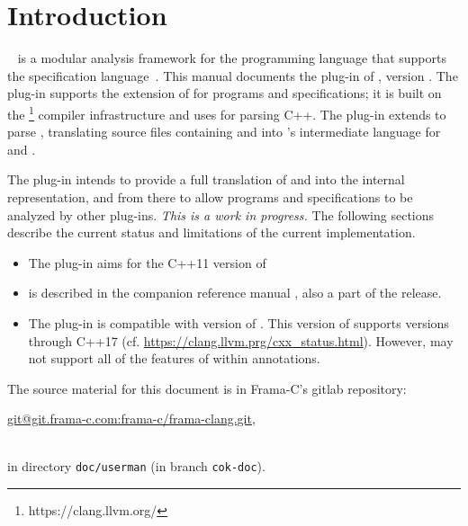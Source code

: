 \chapter{Introduction}

\framac~\cite{userman,fac15} is a modular analysis framework for the \C
programming language that supports the \acsl specification
language~\cite{acsl}. This manual documents the \fclang plug-in of \framac,
version \fclangversion. 
The \fclang plug-in supports the \acslpp extension of \acsl for \cpp programs and specifications; 
it is built on the \clang\footnote{https://clang.llvm.org/} compiler infrastructure and uses \clang for 
parsing C++. The plug-in extends \clang to parse \acslpp, translating source files containing \cpp and \acslpp into \framac's intermediate language for \C and \acsl.

The \fclang plug-in intends to provide a full translation of \cpp and \acslpp into the \framac internal representation, and from there to allow \cpp programs and \acslpp specifications to be analyzed by other \framac plug-ins. 
\textit{This is a work in progress.}
The following sections describe the current status and limitations of the current implementation.
\begin{itemize}
	\item The plug-in aims for the C++11 version of \cpp
	\item \acslpp is described in the companion \acslpp reference manual \cite{acslpp}, also a part of the \framac release.
    \item The plug-in is compatible with version \clangversion of \clang. 
    This version of \clang supports \cpp versions through C++17 
    (cf. \url{https://clang.llvm.prg/cxx_status.html}). 
    However, \fclang may not support all of the features of \cpp within annotations.
\end{itemize}

The source material for this document is in Frama-C's gitlab repository:\\ \centerline{\url{git@git.frama-c.com:frama-c/frama-clang.git},} \\
 in directory \lstinline|doc/userman| (in branch \lstinline|cok-doc|).

